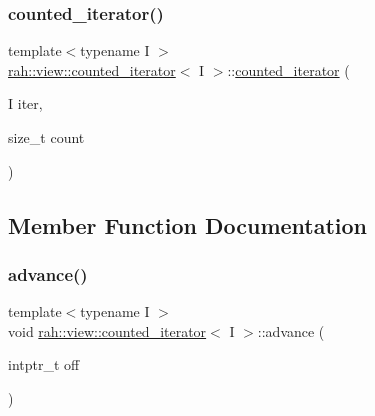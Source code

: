 \mbox{\label{structrah_1_1view_1_1counted__iterator_aa26e9c047e175303c296758316634890}} 
\subsubsection{\texorpdfstring{counted\_iterator()}{counted\_iterator()}\hspace{0.1cm}{\footnotesize\ttfamily [4/4]}}
{\footnotesize\ttfamily template$<$typename I $>$ \\
\mbox{\hyperlink{structrah_1_1view_1_1counted__iterator}{rah\+::view\+::counted\+\_\+iterator}}$<$ I $>$\+::\mbox{\hyperlink{structrah_1_1view_1_1counted__iterator}{counted\+\_\+iterator}} (\begin{DoxyParamCaption}\item[{I}]{iter,  }\item[{size\+\_\+t}]{count }\end{DoxyParamCaption})\hspace{0.3cm}{\ttfamily [inline]}}



\subsection{Member Function Documentation}
\mbox{\label{structrah_1_1view_1_1counted__iterator_abef44b581abb0c70a79dbd6a61ccd200}} 
\subsubsection{\texorpdfstring{advance()}{advance()}\hspace{0.1cm}{\footnotesize\ttfamily [1/2]}}
{\footnotesize\ttfamily template$<$typename I $>$ \\
void \mbox{\hyperlink{structrah_1_1view_1_1counted__iterator}{rah\+::view\+::counted\+\_\+iterator}}$<$ I $>$\+::advance (\begin{DoxyParamCaption}\item[{intptr\+\_\+t}]{off }\end{DoxyParamCaption})\hspace{0.3cm}{\ttfamily [inline]}}

